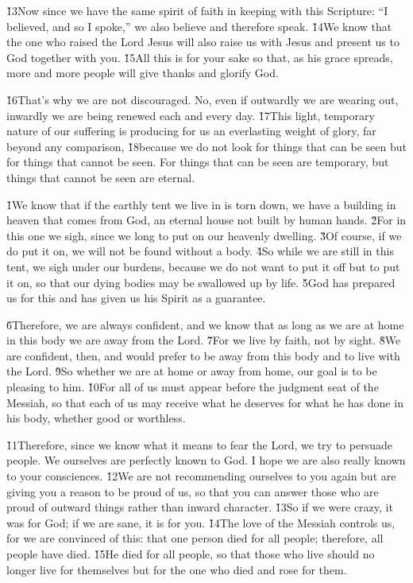 \v{13}Now since we have the same spirit of faith in keeping with this Scripture: ``I believed, and so I spoke,'' we also believe and therefore speak. \v{14}We know that the one who raised the Lord Jesus will also raise us with Jesus and present us to God together with you. \v{15}All this is for your sake so that, as his grace spreads, more and more people will give thanks and glorify God.

\v{16}That's why we are not discouraged. No, even if outwardly we are wearing out, inwardly we are being renewed each and every day. \v{17}This light, temporary nature of our suffering is producing for us an everlasting weight of glory, far beyond any comparison, \v{18}because we do not look for things that can be seen but for things that cannot be seen. For things that can be seen are temporary, but things that cannot be seen are eternal.

\v{1}We know that if the earthly tent we live in is torn down, we have a building in heaven that comes from God, an eternal house not built by human hands. \v{2}For in this one we sigh, since we long to put on our heavenly dwelling. \v{3}Of course, if we do put it on, we will not be found without a body. \v{4}So while we are still in this tent, we sigh under our burdens, because we do not want to put it off but to put it on, so that our dying bodies may be swallowed up by life. \v{5}God has prepared us for this and has given us his Spirit as a guarantee.

\v{6}Therefore, we are always confident, and we know that as long as we are at home in this body we are away from the Lord. \v{7}For we live by faith, not by sight. \v{8}We are confident, then, and would prefer to be away from this body and to live with the Lord. \v{9}So whether we are at home or away from home, our goal is to be pleasing to him. \v{10}For all of us must appear before the judgment seat of the Messiah, so that each of us may receive what he deserves for what he has done in his body, whether good or worthless.

\v{11}Therefore, since we know what it means to fear the Lord, we try to persuade people. We ourselves are perfectly known to God. I hope we are also really known to your consciences. \v{12}We are not recommending ourselves to you again but are giving you a reason to be proud of us, so that you can answer those who are proud of outward things rather than inward character. \v{13}So if we were crazy, it was for God; if we are sane, it is for you. \v{14}The love of the Messiah controls us, for we are convinced of this: that one person died for all people; therefore, all people have died. \v{15}He died for all people, so that those who live should no longer live for themselves but for the one who died and rose for them.

